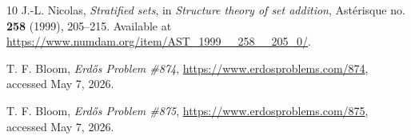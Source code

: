 \documentclass[11pt]{article}
\begin{document}
\begin{thebibliography}{10}
J.-L. Nicolas,
\emph{Stratified sets},
in \emph{Structure theory of set addition}, Ast\'erisque no. \textbf{258} (1999), 205--215.
Available at \url{https://www.numdam.org/item/AST_1999__258__205_0/}.

T. F. Bloom,
\emph{Erd\H{o}s Problem \#874},
\url{https://www.erdosproblems.com/874}, accessed May 7, 2026.

T. F. Bloom,
\emph{Erd\H{o}s Problem \#875},
\url{https://www.erdosproblems.com/875}, accessed May 7, 2026.

\end{thebibliography}
\end{document}
